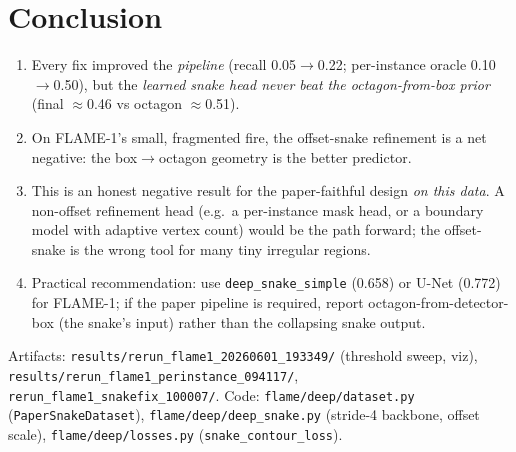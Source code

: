 \documentclass[10pt]{article}
\begin{document}
\section{Conclusion}

\begin{enumerate}
\item Every fix improved the \emph{pipeline} (recall 0.05$\to$0.22; per-instance
  oracle 0.10$\to$0.50), but the \emph{learned snake head never beat the
  octagon-from-box prior} (final $\approx$0.46 vs octagon $\approx$0.51).
\item On FLAME-1's small, fragmented fire, the offset-snake refinement is a net
  negative: the box$\to$octagon geometry is the better predictor.
\item This is an honest negative result for the paper-faithful design \emph{on this
  data}. A non-offset refinement head (e.g.\ a per-instance mask head, or a
  boundary model with adaptive vertex count) would be the path forward; the
  offset-snake is the wrong tool for many tiny irregular regions.
\item Practical recommendation: use \texttt{deep\_snake\_simple} (0.658) or U-Net
  (0.772) for FLAME-1; if the paper pipeline is required, report
  octagon-from-detector-box (the snake's input) rather than the collapsing snake
  output.
\end{enumerate}

\vspace{0.5em}
\footnotesize
Artifacts: \texttt{results/rerun\_flame1\_20260601\_193349/} (threshold sweep, viz),
\texttt{results/rerun\_flame1\_perinstance\_094117/}, \texttt{rerun\_flame1\_snakefix\_100007/}.
Code: \texttt{flame/deep/dataset.py} (\texttt{PaperSnakeDataset}),
\texttt{flame/deep/deep\_snake.py} (stride-4 backbone, offset scale),
\texttt{flame/deep/losses.py} (\texttt{snake\_contour\_loss}).
\end{document}
